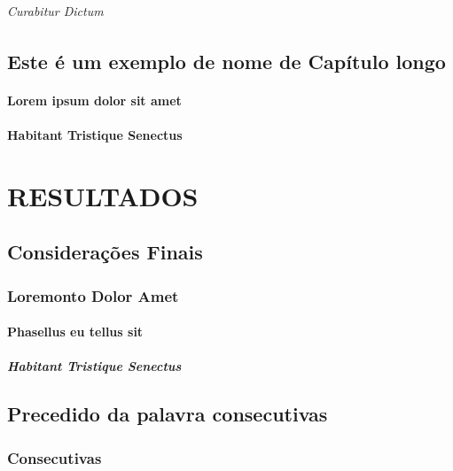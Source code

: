 \documentclass[a4paper,12pt,brazilian,oneside]{Arquivos/Relatorio}
\begin{document}
\paragraph{Curabitur Dictum}
\lipsum[1]

\chapter{Este é um exemplo de nome de Capítulo longo}
\lipsum[1]
\subsection{Lorem ipsum dolor sit amet}
\lipsum[1]
\subsection{Habitant Tristique Senectus}
\lipsum[1]


\part{RESULTADOS}

\chapter{Considerações Finais}
\lipsum[1]
\section{Loremonto Dolor Amet}
\lipsum[1]
\subsection{Phasellus eu tellus sit}
\lipsum[1]
\subsubsection{Habitant Tristique Senectus}
\lipsum[1]






\apendices
\chapter{Precedido da palavra consecutivas}
\section{Consecutivas}
\lipsum[8]
\end{document}
